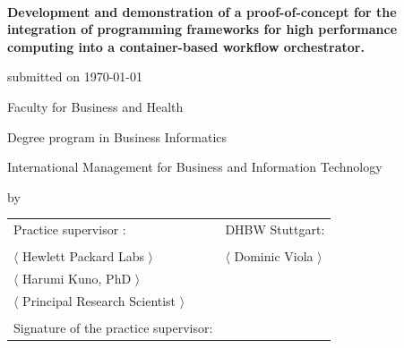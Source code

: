 \begin{spacing}{1}
\begin{center}	
~\vspace{0mm}

{\sffamily
\large  
\textbf{
    Development and demonstration of a proof-of-concept for the integration of programming frameworks for high performance computing into a container-based workflow orchestrator.
    }
\bigskip
\textbf{}
}


\vspace{15mm}

{\Large \typMeinerArbeit}

\vspace{1cm}

submitted on \today 

\vspace{15mm}

Faculty for Business and Health
\medskip

Degree program in Business Informatics

\medskip

International Management for Business and Information Technology 

\vspace{10mm}

by

\vspace{10mm}
    
{\large\textsc{\meinName}}

\vspace{10mm}
\end{center}

\vfill

\begin{tabular}{ll}
Practice supervisor : & DHBW Stuttgart: \\
\hspace{0.4\linewidth} & \\
$\langle$ Hewlett Packard Labs $\rangle$ & $\langle$ Dominic Viola $\rangle$ \\
$\langle$ Harumi Kuno, PhD $\rangle$ 
&  \\
$\langle$ Principal Research Scientist $\rangle$ \\
\\
Signature of the practice supervisor: \\
\end{tabular}


\vspace{1cm}
\end{spacing}


